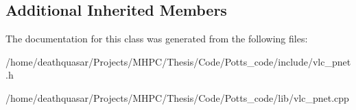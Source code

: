 \subsection*{Additional Inherited Members}


The documentation for this class was generated from the following files\+:\begin{DoxyCompactItemize}
\item 
/home/deathquasar/\+Projects/\+M\+H\+P\+C/\+Thesis/\+Code/\+Potts\+\_\+code/include/vlc\+\_\+pnet.\+h\item 
/home/deathquasar/\+Projects/\+M\+H\+P\+C/\+Thesis/\+Code/\+Potts\+\_\+code/lib/vlc\+\_\+pnet.\+cpp\end{DoxyCompactItemize}
